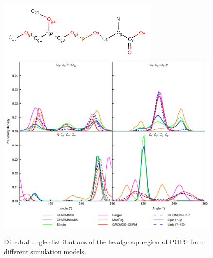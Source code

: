 \documentclass[journal=jpcbfk,manuscript=article]{achemso}
\begin{document}
\begin{figure}[]
  \centering
  \includegraphics[width=8.0cm]{../Figs/PS_Labels.png}
  \includegraphics[width=16.0cm]{../Figs/figS7.png}
  \caption{\label{dihedralsHG}
    Dihedral angle distributions of the headgroup region of POPS from different simulation models.
  }
\end{figure}
\end{document}

